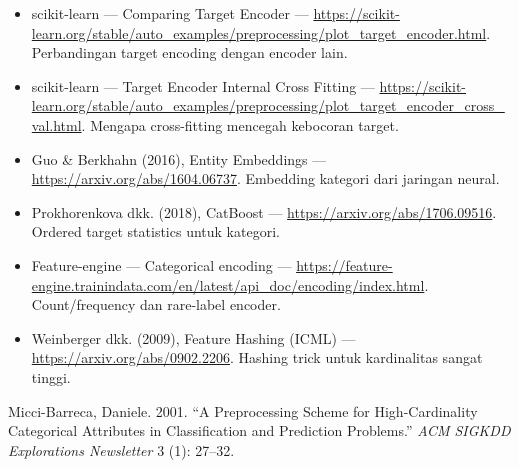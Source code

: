 \begin{bacaan}

\begin{itemize}
\tightlist
\item
  scikit-learn --- Comparing Target Encoder --- \url{https://scikit-learn.org/stable/auto_examples/preprocessing/plot_target_encoder.html}. Perbandingan target encoding dengan encoder lain.
\item
  scikit-learn --- Target Encoder Internal Cross Fitting --- \url{https://scikit-learn.org/stable/auto_examples/preprocessing/plot_target_encoder_cross_val.html}. Mengapa cross-fitting mencegah kebocoran target.
\item
  Guo \& Berkhahn (2016), Entity Embeddings --- \url{https://arxiv.org/abs/1604.06737}. Embedding kategori dari jaringan neural.
\item
  Prokhorenkova dkk. (2018), CatBoost --- \url{https://arxiv.org/abs/1706.09516}. Ordered target statistics untuk kategori.
\item
  Feature-engine --- Categorical encoding --- \url{https://feature-engine.trainindata.com/en/latest/api_doc/encoding/index.html}. Count/frequency dan rare-label encoder.
\item
  Weinberger dkk. (2009), Feature Hashing (ICML) --- \url{https://arxiv.org/abs/0902.2206}. Hashing trick untuk kardinalitas sangat tinggi.
\end{itemize}

\end{bacaan}

\rujukanheading

\protect{}\label{refs}
\begin{CSLReferences}{1}{1}
Micci-Barreca, Daniele. 2001. {``A Preprocessing Scheme for High-Cardinality Categorical Attributes in Classification and Prediction Problems.''} \emph{ACM SIGKDD Explorations Newsletter} 3 (1): 27--32.

\end{CSLReferences}
